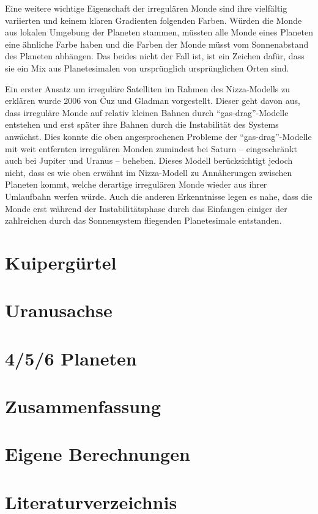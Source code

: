 \documentclass[10pt,a4paper,twoside]{article}
\begin{document}
Eine weitere wichtige Eigenschaft der irregulären Monde sind ihre vielfältig variierten und keinem klaren Gradienten folgenden Farben. Würden die Monde aus lokalen Umgebung der Planeten stammen, müssten alle Monde eines Planeten eine ähnliche Farbe haben und die Farben der Monde müsst vom Sonnenabstand des Planeten abhängen\cite{Nesvorny2007}. Das beides nicht der Fall ist, ist ein Zeichen dafür, dass sie ein Mix aus Planetesimalen von ursprünglich ursprünglichen Orten sind. %

Ein erster Ansatz um irreguläre Satelliten im Rahmen des Nizza-Modells zu erklären wurde 2006 von Ćuz und Gladman vorgestellt\cite{Cuk2006}. Dieser geht davon aus, dass irreguläre Monde auf relativ kleinen Bahnen durch "`gas-drag"'-Modelle entstehen und erst später ihre Bahnen durch die Instabilität des Systems anwächst. Dies konnte die oben angesprochenen Probleme der "`gas-drag"'-Modelle mit weit entfernten irregulären Monden zumindest bei Saturn – eingeschränkt auch bei Jupiter und Uranus – beheben\cite{Cuk2006}. %
Dieses Modell berücksichtigt jedoch nicht, dass es wie oben erwähnt im Nizza-Modell zu Annäherungen zwischen Planeten kommt, welche derartige irregulären Monde wieder aus ihrer Umlaufbahn werfen würde. Auch die anderen Erkenntnisse legen es nahe, dass die Monde erst während der Instabilitätsphase durch das Einfangen einiger der zahlreichen durch das Sonnensystem fliegenden Planetesimale entstanden. %



\newpage %

\section{Kuipergürtel}\label{Kuiper}

\section{Uranusachse}\label{Uranusachse}

\section{4/5/6 Planeten}\label{mehrPlaneten}

\section{Zusammenfassung}

\newpage
\renewcommand{\thesection}{\Alph{section}}
\setcounter{section}{0} %
\section{Eigene Berechnungen}
\section{Literaturverzeichnis}

{}

\end{document}
